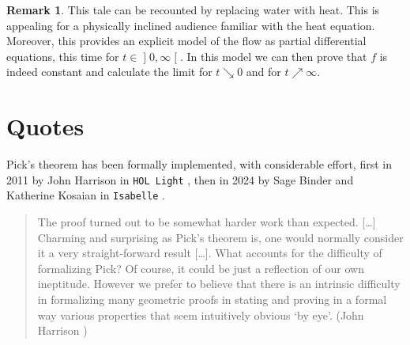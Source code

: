 \documentclass[a4paper]{amsart}
\numberwithin{equation}{section}
\theoremstyle{plain}
\theoremstyle{definition}
\newtheorem{remark}[theorem]{Remark}
\newcommand{\ee}[2]{\mathopen] #1, #2 \mathclose[}
\DeclareMathOperator{\vol}{vol}
\begin{document}
\begin{remark}
  This tale can be recounted by replacing water with heat.
  This is appealing for a physically inclined audience
  familiar with the heat equation. %
  Moreover, this provides an explicit model of the flow
  as partial differential equations, this time for $t \in \ee{0}{\infty}$.
  In this model %
  we can then prove that $f$ is indeed constant
  and calculate the limit for $t \searrow 0$ and for $t \nearrow \infty$.
\end{remark}



\setcounter{section}{16}
\section{Quotes}

Pick's theorem has been formally implemented, with considerable effort,
first in 2011 by John Harrison in \texttt{HOL\,Light} \cite{Harrison:2011},
then in 2024 by Sage Binder and Katherine Kosaian in \texttt{Isabelle}
\cite{Binder:Kosaian:2024}.

\begin{quote}
  The proof turned out to be somewhat harder work than expected. [\dots]
  Charming and surprising as Pick's theorem is, one would normally consider it
  a very straight-forward result [\dots].
  What accounts for the difficulty of formalizing Pick?
  Of course, it could be just a reflection of our own ineptitude.
  However we prefer to believe that there is an intrinsic difficulty
  in formalizing many geometric proofs in stating and proving
  in a formal way various properties that seem intuitively obvious ‘by eye’.
  (John Harrison \cite{Harrison:2011})
\end{quote}
\end{document}
